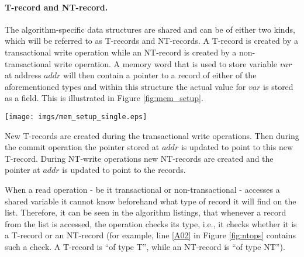 \documentclass[runningheads,a4paper]{llncs}
\begin{document}
\paragraph{T-record  and NT-record.}
The  algorithm-specific  data structures  are shared  and  can be  of 
either  two  kinds, which will be referred   to as T-records and NT-records. 
A T-record is created by a transactional write operation while an 
NT-record is created by a  non-transactional write operation. A memory word
that is used to store  
variable $\mathit{var}$ at address $\mathit{addr}$ will then contain a pointer to a  
record of either of the  aforementioned types and within this structure
the actual value for  $\mathit{var}$ is stored as a field. 
This  is illustrated in Figure  \ref{fig:mem_setup}.

\begin{figure*}[ht]
\centerline{
    \mbox{\texttt{[image: imgs/mem\_setup\_single.eps]}}
}
\caption{The memory setup and the data structures that are used by the 
algorithm.}
\label{fig:mem_setup}
\end{figure*}

New T-records are created during the transactional write operations.
Then during
the commit operation the pointer stored at $\mathit{addr}$ is updated to point to this new T-record.
During NT-write operations new NT-records are created and the pointer at $\mathit{addr}$
is updated to point to the records.

When a read operation - be it transactional or non-transactional - accesses 
a shared variable it cannot know beforehand what type of record it will find 
on the list. Therefore, it can be seen in the algorithm listings, that whenever 
a record from the list is accessed, 
the operation checks its type, i.e., it checks 
whether it is a T-record or an NT-record (for example, line \ref{A02} in Figure 
\ref{fig:ntops} contains such a check. A T-record is {}``of type T'', while an 
NT-record is {}``of type NT''). 
\end{document}

